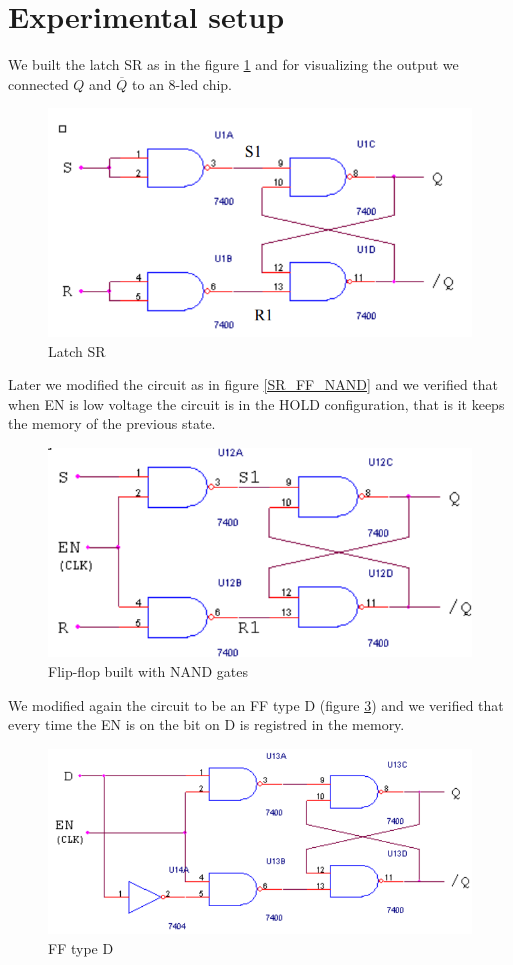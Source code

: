\section{Experimental setup}
We built the latch SR as in the figure \ref{SR_NAND} and for visualizing the output we  connected $Q$ and $\overline{Q}$ to an 8-led chip.
\begin{figure}[H]
\centering
\includegraphics[width=.7\textwidth]{11/SR_NAND.png}
\caption{Latch SR}\label{SR_NAND}
\end{figure}
Later we modified the circuit as in figure \ref{SR_FF_NAND} and we verified that when EN is low voltage the circuit is in the HOLD configuration, that is it keeps the memory of the previous state. 
\begin{figure}[H]
\centering
\includegraphics[width=.7\textwidth]{11/FF_SR_NAND.png}
\caption{Flip-flop built with NAND gates}\label{FF_SR_NAND}

\end{figure}
We modified again the circuit to be an FF type D (figure \ref{D_FF}) and we verified that every time the EN is on the bit on D is registred in the memory.
\begin{figure}[H]
\centering
\includegraphics[width=.7\textwidth]{11/D_FF.png}
\caption{FF type D}\label{D_FF}

\end{figure}

